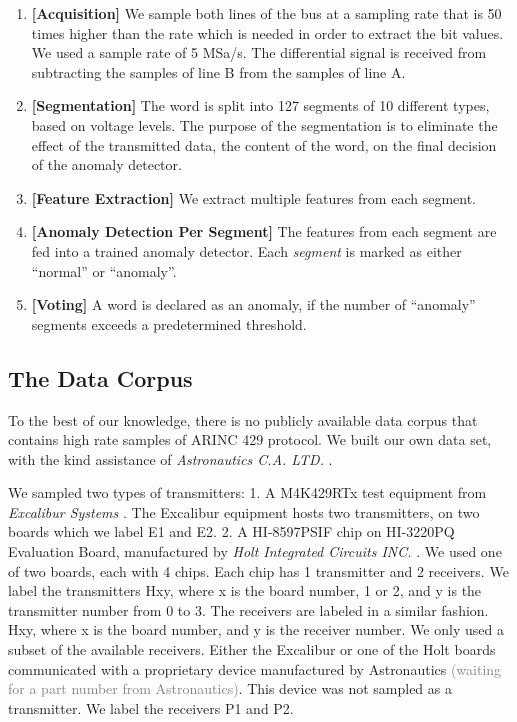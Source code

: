 \documentclass[conference]{IEEEtran}
\begin{document}
  \begin{enumerate}
    \item \textbf{[Acquisition]}
          We sample both lines of the bus at a sampling rate that is 50 times higher than the rate which is needed in order to extract the bit values. We used a sample rate of 5 MSa/s. The differential signal is received from subtracting the samples of line B from the samples of line A.
    \item \textbf{[Segmentation]}
          The word is split into 127 segments of 10 different types, based on voltage levels. The purpose of the segmentation is to eliminate the effect of the transmitted data, the content of the word, on the final decision of the anomaly detector.
    \item \textbf{[Feature Extraction]}
          We extract multiple features from each segment. 
    \item \textbf{[Anomaly Detection Per Segment]}
          The features from each segment are fed into a trained anomaly detector. Each \textit{segment} is marked as either ``normal'' or ``anomaly''.
    \item \textbf{[Voting]}
          A word is declared as an anomaly, if the number of ``anomaly'' segments exceeds a predetermined threshold.
  \end{enumerate}
  
\subsection{The Data Corpus}
  To the best of our knowledge, there is no publicly available data corpus that contains high rate samples of ARINC 429 protocol. We built our own data set, with the kind assistance of \textit{Astronautics C.A. LTD.} \cite{}.
  
  We sampled two types of transmitters: 1. A M4K429RTx test equipment from \textit{Excalibur Systems} \cite{}. The Excalibur equipment hosts two transmitters, on two boards which we label E1 and E2. 2. A HI-8597PSIF chip on HI-3220PQ Evaluation Board, manufactured by \textit{Holt Integrated Circuits INC.} \cite{}. We used one of two boards, each with 4 chips. Each chip has 1 transmitter and 2 receivers. We label the transmitters H{x}{y}, where x is the board number, 1 or 2, and y is the transmitter number from 0 to 3. The receivers are labeled in a similar fashion. H{x}{y}, where x is the board number, and y is the receiver number. We only used a subset of the available receivers. Either the Excalibur or one of the Holt boards communicated with a proprietary device manufactured by Astronautics \textcolor{gray}{(waiting for a part number from Astronautics)}. This device was not sampled as a transmitter. We label the receivers P1 and P2.
  
\end{document}
